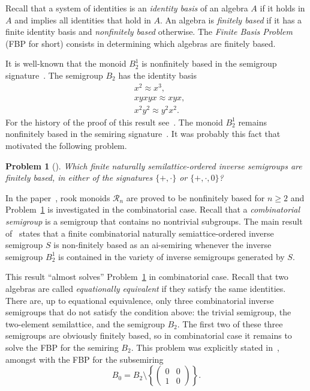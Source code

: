\documentclass[12pt,draft]{amsart}
\newtheorem{problem}{Problem}
\begin{document}
Recall that a system of identities is an \emph{identity basis} of an algebra $A$ if it holds in $A$ and implies all identities that hold in $A$. An algebra is \emph{finitely based} if it has a finite identity basis and \emph{nonfinitely based} otherwise. The \emph{Finite Basis Problem} (FBP for short) consists in determining which algebras are finitely based. 

It is  well-known that the monoid $B_2^1$ is nonfinitely based in the semigroup signature~\cite{Perkins-68}. The semigroup $B_2$ has the identity basis
 \begin{align}
\label{periodicity}
&x^2\approx x^3,\\
\label{shortening}
&xyxyx\approx xyx,\\
\label{commut}
&x^2y^2\approx y^2x^2.
\end{align}
For the history of the proof of this result see~\cite{Volkov-19}. The monoid $B_2^1$ remains nonfinitely based in the semiring signature~\cite{Jackson-22,Volkov-21}. It was pro\-bably this fact that motivated the following problem.

\begin{problem}[{\!\cite[Problem~7.7(3)]{Jackson-22}}]\label{inv sem} 
Which finite naturally semilattice-ordered inverse semigroups are finitely based, in either of the signatures $\{+,\cdot\}$ or $\{+,\cdot,0\}$?
\end{problem}

In the paper~\cite{Gusev-23}, rook monoids $\mathcal R_n$ are proved to be nonfinitely based for $n\ge2$ and Problem~\ref{inv sem} is investigated in the combinatorial case. Recall that a \emph{combinatorial semigroup} is a semigroup that contains no nontrivial subgroups. The main result of~\cite{Gusev-23} states that a finite combinatorial naturally semiattice-ordered inverse semigroup $S$ is non-finitely based as an ai-semiring whenever the inverse semigroup $B_2^1$ is contained in the variety of inverse semigroups generated by $S$. 

This result ``almost solves'' Problem~\ref{inv sem} in combinatorial case. Recall that two algebras are called \emph{equationally equivalent} if they satisfy the same identities. There are, up to equational equivalence, only three combinatorial inverse semigroups that do not satisfy the condition above: the trivial semigroup, the two-element semilattice, and the semigroup $B_2$. The first two of these three semigroups are obviously finitely based, so in combinatorial case it remains to solve the FBP for the semiring $B_2$. This problem was explicitly stated in~\cite{Jackson-22}, amongst with the FBP for the subsemiring
$$B_0=B_2\setminus\left\{\begin{pmatrix}
0&0\\
1&0
\end{pmatrix}\right\}.$$
\end{document}
